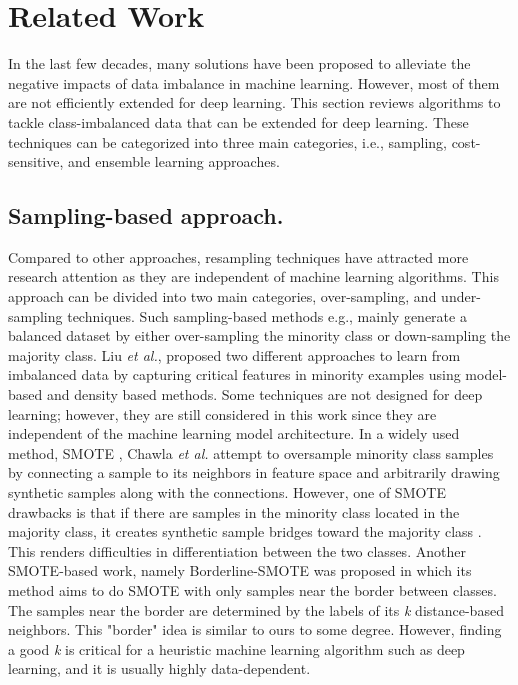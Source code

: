 
\section{Related Work}
\label{sec:relatedwork}
In the last few decades, many solutions have been proposed to alleviate the negative impacts of data imbalance in machine learning. However, most of them are not efficiently extended for deep learning. This section reviews algorithms to tackle class-imbalanced data that can be extended for deep learning. These techniques can be categorized into three main categories, i.e., sampling, cost-sensitive, and ensemble learning approaches. 

\subsection{Sampling-based approach.}
Compared to other approaches, resampling techniques have attracted more research attention as they are independent of machine learning algorithms. This approach can be divided into two main categories, over-sampling, and under-sampling techniques. Such sampling-based methods e.g., \cite{DBLP:journals/corr/ShenLH15, DBLP:journals/corr/abs-1711-00941, haibo_he_learning_2009, li_entropy-based_2020,ertekin_active_2007,8745666,8713384} mainly generate a balanced dataset by either over-sampling the minority class or down-sampling the majority class. Liu \textit{et al.}, \cite{9723474, 8668459} proposed two different approaches to learn from imbalanced data by capturing critical features in minority examples using model-based and density based methods. Some techniques are not designed for deep learning; however, they are still considered in this work since they are independent of the machine learning model architecture. In a widely used method, SMOTE \cite{chawla_smote:_2002}, Chawla \textit{et al.} attempt to oversample minority class samples by connecting a sample to its neighbors in feature space and arbitrarily drawing synthetic samples along with the connections. However, one of SMOTE drawbacks is that if there are samples in the minority class located in the majority class, it creates synthetic sample bridges toward the majority class \cite{goswami_class_2020}. This renders difficulties in differentiation between the two classes. Another SMOTE-based work, namely Borderline-SMOTE \cite{bordersmote} was proposed in which its method aims to do SMOTE with only samples near the border between classes. The samples near the border are determined by the labels of its \textit{k} distance-based neighbors. This "border" idea is similar to ours to some degree. However, finding a good \textit{k} is critical for a heuristic machine learning algorithm such as deep learning, and it is usually highly data-dependent. 

